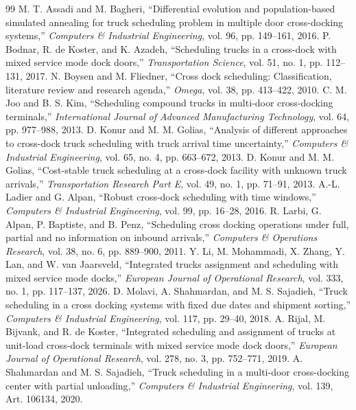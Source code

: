\documentclass[11pt,a4paper]{article}
\begin{document}
\begin{thebibliography}{99}\small
{} M. T. Assadi and M. Bagheri, ``Differential evolution and population-based simulated annealing for truck scheduling problem in multiple door cross-docking systems,'' \emph{Computers \& Industrial Engineering}, vol. 96, pp. 149--161, 2016.
 P. Bodnar, R. de Koster, and K. Azadeh, ``Scheduling trucks in a cross-dock with mixed service mode dock doors,'' \emph{Transportation Science}, vol. 51, no. 1, pp. 112--131, 2017.
 N. Boysen and M. Fliedner, ``Cross dock scheduling: Classification, literature review and research agenda,'' \emph{Omega}, vol. 38, pp. 413--422, 2010.
 C. M. Joo and B. S. Kim, ``Scheduling compound trucks in multi-door cross-docking terminals,'' \emph{International Journal of Advanced Manufacturing Technology}, vol. 64, pp. 977--988, 2013.
 D. Konur and M. M. Golias, ``Analysis of different approaches to cross-dock truck scheduling with truck arrival time uncertainty,'' \emph{Computers \& Industrial Engineering}, vol. 65, no. 4, pp. 663--672, 2013.
 D. Konur and M. M. Golias, ``Cost-stable truck scheduling at a cross-dock facility with unknown truck arrivals,'' \emph{Transportation Research Part E}, vol. 49, no. 1, pp. 71--91, 2013.
 A.-L. Ladier and G. Alpan, ``Robust cross-dock scheduling with time windows,'' \emph{Computers \& Industrial Engineering}, vol. 99, pp. 16--28, 2016.
 R. Larbi, G. Alpan, P. Baptiste, and B. Penz, ``Scheduling cross docking operations under full, partial and no information on inbound arrivals,'' \emph{Computers \& Operations Research}, vol. 38, no. 6, pp. 889--900, 2011.
 Y. Li, M. Mohammadi, X. Zhang, Y. Lan, and W. van Jaarsveld, ``Integrated trucks assignment and scheduling with mixed service mode docks,'' \emph{European Journal of Operational Research}, vol. 333, no. 1, pp. 117--137, 2026.
 D. Molavi, A. Shahmardan, and M. S. Sajadieh, ``Truck scheduling in a cross docking systems with fixed due dates and shipment sorting,'' \emph{Computers \& Industrial Engineering}, vol. 117, pp. 29--40, 2018.
 A. Rijal, M. Bijvank, and R. de Koster, ``Integrated scheduling and assignment of trucks at unit-load cross-dock terminals with mixed service mode dock doors,'' \emph{European Journal of Operational Research}, vol. 278, no. 3, pp. 752--771, 2019.
 A. Shahmardan and M. S. Sajadieh, ``Truck scheduling in a multi-door cross-docking center with partial unloading,'' \emph{Computers \& Industrial Engineering}, vol. 139, Art. 106134, 2020.

\end{thebibliography}
\end{document}
